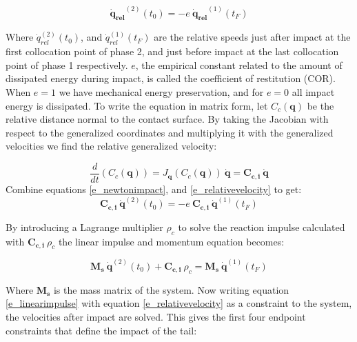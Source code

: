 \documentclass[default,iicol]{sn-jnl}
\theoremstyle{thmstyleone}%
\theoremstyle{thmstyletwo}%
\theoremstyle{thmstylethree}%
\begin{document}
\begin{equation}\label{e_newtonimpact}
    \mathbf{\dot q_{rel}}^{(2)}(t_0) = -e\ \mathbf{\dot q_{rel}}^{(1)}(t_F)
\end{equation}

Where $\dot q_{rel}^{(2)}(t_0)$, and $\dot q_{rel}^{(1)}(t_F)$ are the relative speeds just after impact at the first collocation point of phase 2, and just before impact at the last collocation point of phase 1 respectively.  $e$, the empirical constant related to the amount of dissipated energy during impact, is called the coefficient of restitution (COR). When $e=1$ we have mechanical energy preservation, and for $e=0$ all impact energy is dissipated. To write the equation in matrix form, let $C_c(\mathbf{q})$ be the relative distance normal to the contact surface. By taking the Jacobian with respect to the generalized coordinates and multiplying it with the generalized velocities we find the relative generalized velocity:

\begin{equation}\label{e_relativevelocity}
    \frac{d}{dt}\left(C_c(\mathbf{q})\right) = J_{\mathbf{q}}(C_c(\mathbf{q}))\ \mathbf{\dot q} = \mathbf{C_{c,i}}\  \mathbf{\dot q}
\end{equation}
Combine equations \ref{e_newtonimpact}, and \ref{e_relativevelocity} to get:
\begin{equation}
    \mathbf{C_{c,i}}\  \mathbf{\dot q}^{(2)}(t_0) = -e\ \mathbf{C_{c,i}}\ \mathbf{\dot q}^{(1)}(t_F)
\end{equation}

By introducing a Lagrange multiplier $\rho_c$ to solve the reaction impulse calculated with $\mathbf{C_{c,i}}\ \rho_c$ the linear impulse and momentum equation becomes:

\begin{equation}\label{e_linearimpulse}
    \mathbf{M_s}\ \mathbf{\dot q}^{(2)}(t_0) + \mathbf{C_{c,i}}\ \rho_c = \mathbf{M_s}\ \mathbf{\dot q}^{(1)}(t_F)
\end{equation}

Where $\mathbf{M_s}$ is the mass matrix of the system. Now writing equation \ref{e_linearimpulse} with equation \ref{e_relativevelocity} as a constraint to the system, the velocities after impact are solved. This gives the first four endpoint constraints that define the impact of the tail:
\end{document}
